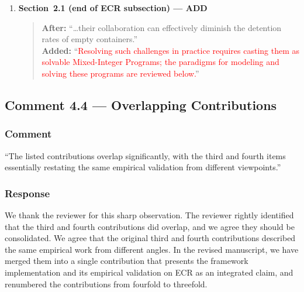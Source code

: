 \documentclass[11pt,a4paper]{article}
\begin{document}
\begin{enumerate}
\begin{quote}
\textbf{After:} ``\ldots employs container SCM as a representative application scenario.''\\[4pt]
\textbf{Added:} ``\textcolor{red}{We organize this review in two parts. We first survey the empty container repositioning challenges that motivate this work. We then trace the evolution of MIP modeling paradigms used to address such problems, from the expert-driven traditional approach, through the emerging paradigm in which a \emph{single} LLM handles the entire modeling-to-solving pipeline, to the multi-agent collaborative paradigm on which our work builds.}''
\end{quote}
\item \textbf{Section~2.1 (end of ECR subsection) --- ADD}
\begin{quote}
\textbf{After:} ``\ldots their collaboration can effectively diminish the detention rates of empty containers.''\\[4pt]
\textbf{Added:} ``\textcolor{red}{Resolving such challenges in practice requires casting them as solvable Mixed-Integer Programs; the paradigms for modeling and solving these programs are reviewed below.}''
\end{quote}
\end{enumerate}

\subsection{Comment 4.4 --- Overlapping Contributions}

\subsubsection{Comment}
``The listed contributions overlap significantly, with the third and fourth items essentially restating the same empirical validation from different viewpoints.''

\subsubsection{Response}
We thank the reviewer for this sharp observation. The reviewer rightly identified that the third and fourth contributions did overlap, and we agree they should be consolidated. We agree that the original third and fourth contributions described the same empirical work from different angles. In the revised manuscript, we have merged them into a single contribution that presents the framework implementation and its empirical validation on ECR as an integrated claim, and renumbered the contributions from fourfold to threefold.
\end{document}
